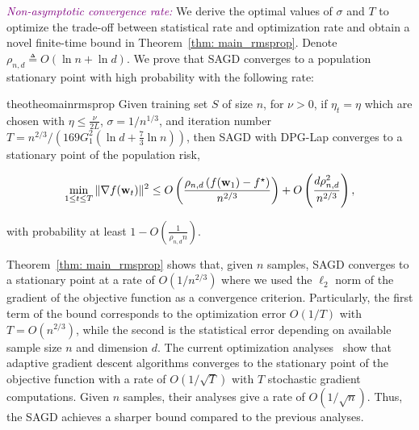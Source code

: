 \documentclass[11pt]{article}
\begin{document}
\textcolor{purple}{\textit{Non-asymptotic convergence rate:}}
We derive the optimal values of $\sigma$ and $T$ to optimize the trade-off between statistical rate and optimization rate and obtain a novel finite-time bound in Theorem~\ref{thm: main_rmsprop}. 
Denote $\rho_{n,d} \triangleq O \left(\ln n + \ln d\right)$.
We prove that \textsc{SAGD} converges to a population stationary point with high probability with the following rate:
\begin{restatable}{theo}{theomainrmsprop}
\label{thm: main_rmsprop}
 Given training set $S$ of size $n$, for $\nu >0$, if $\eta_t = \eta$ which are chosen with $\eta \leq \frac{\nu}{2L}$,  $\sigma = 1/n^{1/3}$, and iteration number $T = n^{2/3}/\left(169G_1^2(\ln d + \frac{7}{3}\ln n)\right)$, then \textsc{SAGD} with DPG-Lap converges to a stationary point of the population risk, \ie 
 \begin{small}
\begin{equation*}
 \min_{1\leq t \leq T}\|\nabla f(\mathbf{w}_t)\|^2 \leq
 O \left( \frac{\rho_{n,d} \left(f(\mathbf{w}_1) - f^\star \right)}{n^{2/3}} \right) + O \left( \frac{d \rho_{n,d}^2}{n^{2/3}}\right),
\end{equation*}
\end{small}
with probability at least $1-O\left(\frac{1}{\rho_{n,d} n}\right)$.
\end{restatable} 
Theorem~\ref{thm: main_rmsprop} shows that, given $n$ samples, \textsc{SAGD} converges to a stationary point at a rate of $O(1/n^{2/3})$ where we used the $\ell_2$ norm of the gradient of the objective function as a convergence criterion.
Particularly, the first term of the bound corresponds to the optimization error $O(1/T)$ with $T = O(n^{2/3})$, while the second is the statistical error depending on available sample size $n$ and dimension $d$. 
The current optimization analyses~\citep{zare18, wawu19, zosh2019, cheli2019} show that adaptive gradient descent algorithms converges to the stationary point of the objective function with a rate of $O(1/\sqrt{T})$ with $T$ stochastic gradient computations. 
Given $n$ samples, their analyses give a rate of  $O(1/\sqrt{n})$. 
Thus, the \textsc{SAGD} achieves a sharper bound compared to the previous analyses.  
\vspace{-0.05in}
\end{document}
